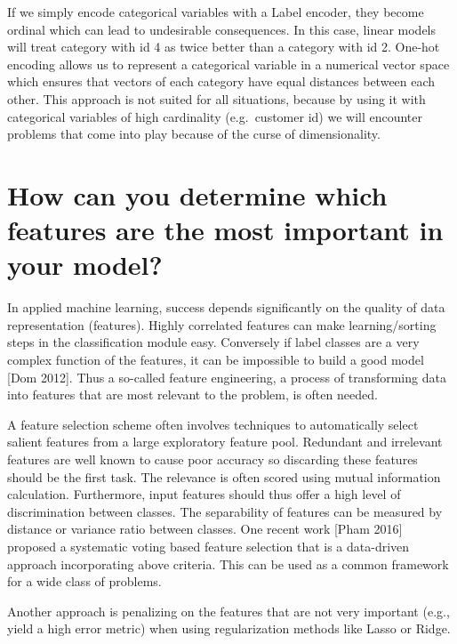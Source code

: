 \documentclass[
]{book}
\begin{document}
If we simply encode categorical variables with a Label encoder, they become ordinal which can lead to undesirable consequences. In this case, linear models will treat category with id 4 as twice better than a category with id 2. One-hot encoding allows us to represent a categorical variable in a numerical vector space which ensures that vectors of each category have equal distances between each other. This approach is not suited for all situations, because by using it with categorical variables of high cardinality (e.g.~customer id) we will encounter problems that come into play because of the curse of dimensionality.

\hypertarget{how-can-you-determine-which-features-are-the-most-important-in-your-model}{%
\section{How can you determine which features are the most important in your model?}\label{how-can-you-determine-which-features-are-the-most-important-in-your-model}}

In applied machine learning, success depends significantly on the quality of data representation (features). Highly correlated features can make learning/sorting steps in the classification module easy. Conversely if label classes are a very complex function of the features, it can be impossible to build a good model {[}Dom 2012{]}. Thus a so-called feature engineering, a process of transforming data into features that are most relevant to the problem, is often needed.

A feature selection scheme often involves techniques to automatically select salient features from a large exploratory feature pool. Redundant and irrelevant features are well known to cause poor accuracy so discarding these features should be the first task. The relevance is often scored using mutual information calculation. Furthermore, input features should thus offer a high level of discrimination between classes. The separability of features can be measured by distance or variance ratio between classes. One recent work {[}Pham 2016{]} proposed a systematic voting based feature selection that is a data-driven approach incorporating above criteria. This can be used as a common framework for a wide class of problems.

Another approach is penalizing on the features that are not very important (e.g., yield a high error metric) when using regularization methods like Lasso or Ridge.
\end{document}
